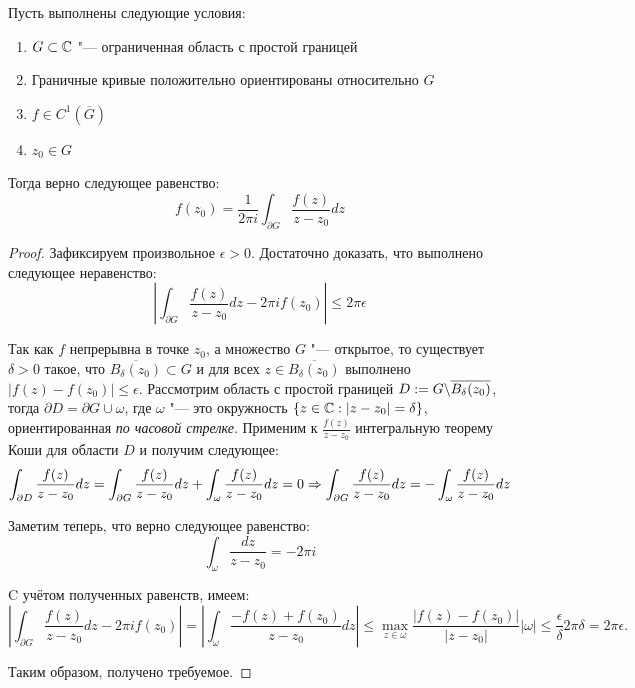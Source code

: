 
\begin{theorem}
\label{cauchy-integral-formula}
	Пусть выполнены следующие условия:
	\begin{enumerate}
		\item $G \subset \mathbb{C}$ "--- ограниченная область с простой границей
		
		\item Граничные кривые положительно ориентированы относительно $G$
		
		\item $f \in C^1(\overline{G})$
		
		\item $z_0 \in G$
	\end{enumerate}
	
	Тогда верно следующее равенство:
	\[f(z_0) = \frac{1}{2\pi i}\int_{\partial G}\frac{f(z)}{z - z_0}dz\]
\end{theorem}

\begin{proof}
	Зафиксируем произвольное $\epsilon > 0$. Достаточно доказать, что выполнено следующее неравенство:
	\[\left|\int_{\partial G}\frac{f(z)}{z - z_0}dz - 2\pi if(z_0)\right| \le 2\pi\epsilon\]
	
	Так как $f$ непрерывна в точке $z_0$, а множество $G$ "--- открытое, то существует $\delta > 0$ такое, что $\overline{B_\delta(z_0)} \subset G$ и для всех $z \in \overline{B_\delta(z_0)}$ выполнено $|f(z) - f(z_0)| \le \epsilon$. Рассмотрим область с простой границей $D := G \backslash \overline{B_\delta(z_0)}$, тогда $\partial D = \partial G \cup \omega$, где $\omega$ "--- это окружность $\{z \in \mathbb{C}: |z - z_0| = \delta\}$, ориентированная \textit{по часовой стрелке}. Применим к $\frac{f(z)}{z - z_0}$ интегральную теорему Коши для области $D$ и получим следующее:
	\[\int_{\partial D}\frac{f(z)}{z - z_0}dz = \int_{\partial G}\frac{f(z)}{z - z_0}dz + \int_{\omega}\frac{f(z)}{z - z_0}dz = 0 \Rightarrow \int_{\partial G}\frac{f(z)}{z - z_0}dz = -\int_{\omega}\frac{f(z)}{z - z_0}dz\]
	
	Заметим теперь, что верно следующее равенство:
	\[\int_{\omega}\frac{dz}{z - z_0} = -2\pi i\]
	
	C учётом полученных равенств, имеем:
	\[\left|\int_{\partial G}\frac{f(z)}{z - z_0}dz - 2\pi if(z_0)\right| = \left|\int_{\omega}\frac{-f(z) + f(z_0)}{z - z_0}dz\right| \le \max_{z \in \omega}\frac{|f(z) - f(z_0)|}{|z - z_0|}|\omega| \le \frac \epsilon \delta 2\pi\delta = 2 \pi \epsilon.\]
	
	Таким образом, получено требуемое.
\end{proof}